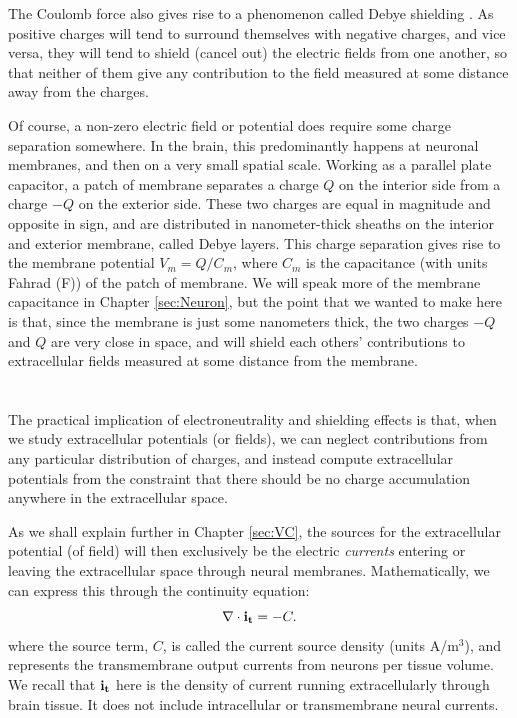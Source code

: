 The Coulomb force also gives rise to a phenomenon called Debye shielding \cite{Nunez2006}. As positive charges will tend to surround themselves with negative charges, and vice versa, they will tend to shield (cancel out) the electric fields from one another, so that neither of them give any contribution to the field measured at some distance away from the charges.

Of course, a non-zero electric field or potential does require some charge separation somewhere. In the brain, this predominantly happens at neuronal membranes, and then on a very small spatial scale. Working as a parallel plate capacitor, a patch of membrane separates a charge $Q$ on the interior side from a charge $-Q$ on the exterior side. These two charges are equal in magnitude and opposite in sign, and are distributed in nanometer-thick sheaths on the interior and exterior membrane, called Debye layers. This charge separation gives rise to the membrane potential $V_m = Q/C_m$, where $C_m$ is the capacitance (with units Fahrad (F)) of the patch of membrane. We will speak more of the membrane capacitance in Chapter \ref{sec:Neuron}, but the point that we wanted to make here is that, since the membrane is just some nanometers thick, the two charges $-Q$ and $Q$ are very close in space, and will shield each others' contributions to extracellular fields measured at some distance from the membrane. 


\section{}
\label{sec:Basics:C} 
The practical implication of electroneutrality and shielding effects is that, when we study extracellular potentials (or fields), we can neglect contributions from any particular distribution of charges, and instead compute extracellular potentials from the constraint that there should be no charge accumulation anywhere in the extracellular space. 

As we shall explain further in Chapter \ref{sec:VC}, the sources for the extracellular potential (of field) will then exclusively be the electric \textit{currents} entering or leaving the extracellular space through neural membranes. Mathematically, we can express this through the continuity equation:
\begin{equation}
\nabla \cdot {\bf i_t} = -C.
\label{Basics:eq:continuity1}
\end{equation}
where the source term, $C$, is called the current source density (units A/m$^3$), and represents  
the transmembrane output currents from neurons per tissue volume. We recall that ${\bf i_t}$ here is the density of current running extracellularly through brain tissue. It does not include intracellular or transmembrane neural currents. 

